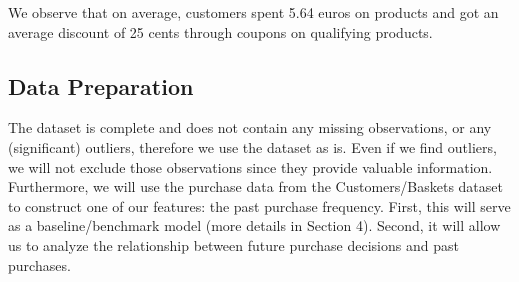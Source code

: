 We observe that on average, customers spent 5.64 euros on products and got an
average discount of 25 cents through coupons on qualifying products.

\subsection{Data Preparation}
The dataset is complete and does not contain any missing observations, or any
(significant) outliers, therefore we use the dataset as is. Even if we find
outliers, we will not exclude those observations since they provide valuable
information. Furthermore, we will use the purchase data from the
Customers/Baskets dataset to construct one of our features: the past purchase
frequency. First, this will serve as a baseline/benchmark model (more details in
Section 4). Second, it will allow us to analyze the relationship between future
purchase decisions and past purchases.
